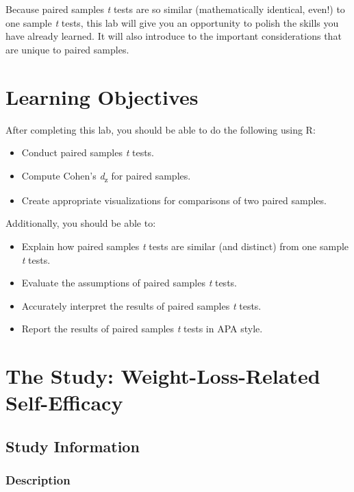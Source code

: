 \documentclass[
]{book}
\providecommand{\tightlist}{%
  \setlength{\itemsep}{0pt}\setlength{\parskip}{0pt}}
\begin{document}
Because paired samples \emph{t} tests are so similar (mathematically identical, even!) to one sample \emph{t} tests, this lab will give you an opportunity to polish the skills you have already learned. It will also introduce to the important considerations that are unique to paired samples.

\hypertarget{pst-learning-objectives}{%
\section{Learning Objectives}\label{pst-learning-objectives}}

After completing this lab, you should be able to do the following using R:

\begin{itemize}
\tightlist
\item
  Conduct paired samples \emph{t} tests.
\item
  Compute Cohen's \emph{d}\textsubscript{z} for paired samples.
\item
  Create appropriate visualizations for comparisons of two paired samples.
\end{itemize}

Additionally, you should be able to:

\begin{itemize}
\tightlist
\item
  Explain how paired samples \emph{t} tests are similar (and distinct) from one sample \emph{t} tests.
\item
  Evaluate the assumptions of paired samples \emph{t} tests.
\item
  Accurately interpret the results of paired samples \emph{t} tests.
\item
  Report the results of paired samples \emph{t} tests in APA style.
\end{itemize}

\hypertarget{pst-study}{%
\section{The Study: Weight-Loss-Related Self-Efficacy}\label{pst-study}}

\hypertarget{study-information}{%
\subsection{Study Information}\label{study-information}}

\hypertarget{description}{%
\subsubsection{Description}\label{description}}
\end{document}
